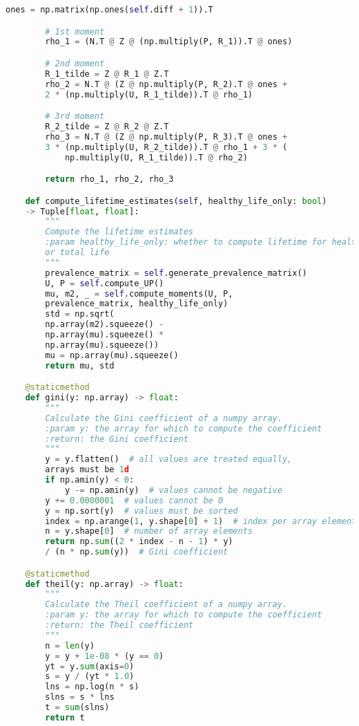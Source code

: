 \begin{lstlisting}[language=Python]
        ones = np.matrix(np.ones(self.diff + 1)).T

        # 1st moment
        rho_1 = (N.T @ Z @ (np.multiply(P, R_1)).T @ ones)

        # 2nd moment
        R_1_tilde = Z @ R_1 @ Z.T
        rho_2 = N.T @ (Z @ np.multiply(P, R_2).T @ ones +
        2 * (np.multiply(U, R_1_tilde)).T @ rho_1)

        # 3rd moment
        R_2_tilde = Z @ R_2 @ Z.T
        rho_3 = N.T @ (Z @ np.multiply(P, R_3).T @ ones +
        3 * (np.multiply(U, R_2_tilde)).T @ rho_1 + 3 * (
            np.multiply(U, R_1_tilde)).T @ rho_2)

        return rho_1, rho_2, rho_3

    def compute_lifetime_estimates(self, healthy_life_only: bool)
    -> Tuple[float, float]:
        """
        Compute the lifetime estimates
        :param healthy_life_only: whether to compute lifetime for healthy
        or total life
        """
        prevalence_matrix = self.generate_prevalence_matrix()
        U, P = self.compute_UP()
        mu, m2, _ = self.compute_moments(U, P, 
        prevalence_matrix, healthy_life_only)
        std = np.sqrt(
        np.array(m2).squeeze() - 
        np.array(mu).squeeze() * 
        np.array(mu).squeeze())
        mu = np.array(mu).squeeze()
        return mu, std

    @staticmethod
    def gini(y: np.array) -> float:
        """
        Calculate the Gini coefficient of a numpy array.
        :param y: the array for which to compute the coefficient
        :return: the Gini coefficient
        """
        y = y.flatten()  # all values are treated equally, 
        arrays must be 1d
        if np.amin(y) < 0:
            y -= np.amin(y)  # values cannot be negative
        y += 0.0000001  # values cannot be 0
        y = np.sort(y)  # values must be sorted
        index = np.arange(1, y.shape[0] + 1)  # index per array element
        n = y.shape[0]  # number of array elements
        return np.sum((2 * index - n - 1) * y)
        / (n * np.sum(y))  # Gini coefficient

    @staticmethod
    def theil(y: np.array) -> float:
        """
        Calculate the Theil coefficient of a numpy array.
        :param y: the array for which to compute the coefficient
        :return: the Theil coefficient
        """
        n = len(y)
        y = y + 1e-08 * (y == 0)
        yt = y.sum(axis=0)
        s = y / (yt * 1.0)
        lns = np.log(n * s)
        slns = s * lns
        t = sum(slns)
        return t
        
        
\end{lstlisting}


